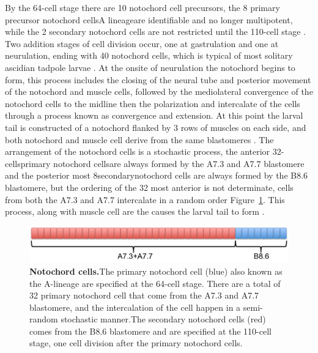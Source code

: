 By the 64-cell stage there are 10 notochord cell precursors, the 8 primary precursor notochord cells\textemdash A lineage\textemdash are identifiable and no longer multipotent, while the 2 secondary notochord cells are not restricted until the 110-cell stage \cite{nishida_cell_1985,yasuo_ascidian_1994,yasuo_conservation_1998,lemaire_unfolding_2009}. Two addition stages of cell division occur, one at gastrulation and one at neurulation, ending with 40 notochord cells, which is typical of most solitary ascidian tadpole larvae \cite{conklin_organization_1905}. At the onsite of neurulation the notochord begins to form, this process includes the closing of the neural tube and posterior movement of the notochord and muscle cells, followed by the mediolateral convergence of the notochord cells to the midline then the polarization and intercalate of the cells through a process known as convergence and extension\cite{swalla_mechanisms_1993}. At this point the larval tail is constructed of a notochord flanked by 3 rows of muscles on each side, and both notochord and muscle cell derive from the same blastomeres \cite{nishida_cell_1985}. The arrangement of the notochord cells is a stochastic process, the anterior 32-cells\textemdash primary notochord cells\textemdash are always formed by the A7.3 and A7.7 blastomere and the posterior most 8\textemdash secondary\textemdash notochord cells are always formed by the B8.6 blastomere, but the ordering of the 32 most anterior is not determinate, cells from both the A7.3 and A7.7 intercalate in a random order Figure~\ref{fig:noto_cells}\cite{nishida_cell_1983,nishida_cell_1985,miyamoto_formation_1985, swalla_mechanisms_1993,kourakis_one-dimensional_2014}. This process, along with muscle cell are the causes the larval tail to form \cite{miyamoto_formation_1985, jeffery_factors_1992,swalla_mechanisms_1993}.

\begin{figure}[tbp]
\centering
\includegraphics[scale=0.5]{figures/noto_cells.pdf}
\caption{\textbf{Notochord cells.}The primary notochord cell (blue) also known as the A-lineage are specified at the 64-cell stage. There are a total of 32 primary notochord cell that come from the A7.3 and A7.7 blastomere, and the intercalation of the cell happen in a semi-random stochastic manner.The secondary notochord cells (red) comes from the B8.6 blastomere and are specified at the 110-cell stage, one cell division after the primary notochord cells.}
\label{fig:noto_cells}
\end{figure}

